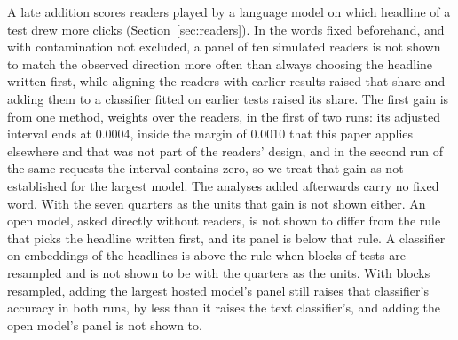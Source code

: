 A late addition scores readers played by a language model on which headline of a test drew more clicks (Section~\ref{sec:readers}). In the words fixed beforehand, and with contamination not excluded, a panel of ten simulated readers is not shown to match the observed direction more often than always choosing the headline written first, while aligning the readers with earlier results raised that share and adding them to a classifier fitted on earlier tests raised its share. The first gain is from one method, weights over the readers, in the first of two runs: its adjusted interval ends at 0.0004, inside the margin of 0.0010 that this paper applies elsewhere and that was not part of the readers' design, and in the second run of the same requests the interval contains zero, so we treat that gain as not established for the largest model. The analyses added afterwards carry no fixed word. With the seven quarters as the units that gain is not shown either. An open model, asked directly without readers, is not shown to differ from the rule that picks the headline written first, and its panel is below that rule. A classifier on embeddings of the headlines is above the rule when blocks of tests are resampled and is not shown to be with the quarters as the units. With blocks resampled, adding the largest hosted model's panel still raises that classifier's accuracy in both runs, by less than it raises the text classifier's, and adding the open model's panel is not shown to.

